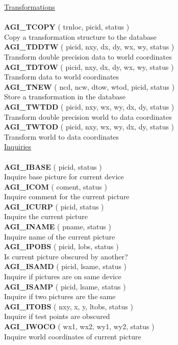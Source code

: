 \begin{tabbing}
\underline{Transformations}\\ \\
{\bf AGI\_TCOPY} \> ( trnloc, picid, status )\\
                 \> Copy a transformation structure to the database\\[1ex]
{\bf AGI\_TDDTW} \> ( picid, nxy, dx, dy, wx, wy, status )\\
                 \> Transform double precision data to world coordinates\\[1ex]
{\bf AGI\_TDTOW} \> ( picid, nxy, dx, dy, wx, wy, status )\\
                 \> Transform data to world coordinates\\[1ex]
{\bf AGI\_TNEW}  \> ( ncd, ncw, dtow, wtod, picid, status )\\
                 \> Store a transformation in the database\\[1ex]
{\bf AGI\_TWTDD} \> ( picid, nxy, wx, wy, dx, dy, status )\\
                 \> Transform double precision world to data coordinates\\[1ex]
{\bf AGI\_TWTOD} \> ( picid, nxy, wx, wy, dx, dy, status )\\
                 \> Transform world to data coordinates\\[2ex]

\underline{Inquiries}\\ \\
{\bf AGI\_IBASE} \> ( picid, status )\\
                 \> Inquire base picture for current device\\[1ex]
{\bf AGI\_ICOM}  \> ( coment, status )\\
                 \> Inquire comment for the current picture\\[1ex]
{\bf AGI\_ICURP} \> ( picid, status )\\
                 \> Inquire the current picture\\[1ex]
{\bf AGI\_INAME} \> ( pname, status )\\
                 \> Inquire name of the current picture\\[1ex]
{\bf AGI\_IPOBS} \> ( picid, lobs, status )\\
                 \> Is current picture obscured by another?\\[1ex]
{\bf AGI\_ISAMD} \> ( picid, lsame, status )\\
                 \> Inquire if pictures are on same device\\[1ex]
{\bf AGI\_ISAMP} \> ( picid, lsame, status )\\
                 \> Inquire if two pictures are the same\\[1ex]
{\bf AGI\_ITOBS} \> ( nxy, x, y, ltobs, status )\\
                 \> Inquire if test points are obscured\\[1ex]
{\bf AGI\_IWOCO} \> ( wx1, wx2, wy1, wy2, status )\\
                 \> Inquire world coordinates of current picture\\[2ex]


\end{tabbing}
